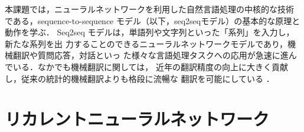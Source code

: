 ﻿



本課題では，ニューラルネットワークを利用した自然言語処理の中核的な技術
である，sequence-to-sequence モデル（以下，seq2seqモデル）の基本的な原理と動作を学ぶ．
Seq2seq モデルは，単語列や文字列といった「系列」を入力し，新たな系列を出
力することのできるニューラルネットワークモデルであり，機械翻訳や質問応答，対話といっ
た様々な言語処理タスクへの応用が急速に進んでいる．なかでも機械翻訳に関しては，
近年の翻訳精度の向上に大きく貢献し，従来の統計的機械翻訳よりも格段に流暢な
翻訳を可能にしている \cite{wu2016google}．


%
%
%
%
%
%
%
%
%

%
%
%
%
%


\section{リカレントニューラルネットワーク}
\label{sec:rnn}

